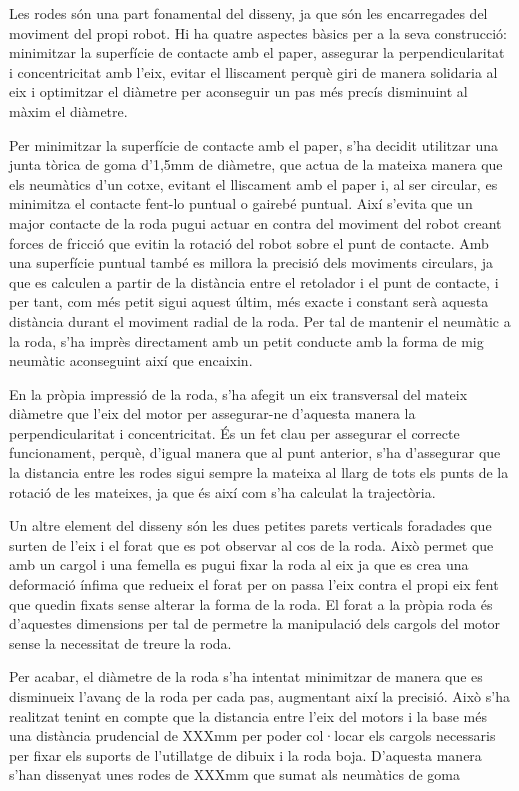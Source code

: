 Les rodes són una part fonamental del disseny, ja que són les encarregades del moviment del propi robot. Hi ha quatre aspectes bàsics per a la seva construcció: minimitzar la superfície de contacte amb el paper, assegurar la perpendicularitat i concentricitat amb l’eix, evitar el lliscament perquè giri de manera solidaria al eix i optimitzar el diàmetre per aconseguir un pas més precís disminuint al màxim el diàmetre. 

Per minimitzar la superfície de contacte amb el paper, s’ha decidit utilitzar una junta tòrica de goma d’1,5mm de diàmetre, que actua de la mateixa manera que els neumàtics d’un cotxe, evitant el lliscament amb el paper i, al ser circular, es minimitza el contacte fent-lo puntual o gairebé puntual. Així s’evita que un major contacte de la roda pugui actuar en contra del moviment del robot creant forces de fricció que evitin la rotació del robot sobre el punt de contacte. Amb una superfície puntual també es millora la precisió dels moviments circulars, ja que es calculen a partir de la distància entre el retolador i el punt de contacte, i per tant, com més petit sigui aquest últim, més exacte i constant serà aquesta distància durant el moviment radial de la roda. Per tal de mantenir el neumàtic a la roda, s’ha imprès directament amb un petit conducte amb la forma de mig neumàtic aconseguint així que encaixin. 

En la pròpia impressió de la roda, s’ha afegit un eix transversal del mateix diàmetre que l’eix del motor per assegurar-ne d’aquesta manera la perpendicularitat i concentricitat. És un fet clau per assegurar el correcte funcionament, perquè, d’igual manera que al punt anterior, s’ha d’assegurar que la distancia entre les rodes sigui sempre la mateixa al llarg de tots els punts de la rotació de les mateixes, ja que és així com s’ha calculat la trajectòria. 

Un altre element del disseny són les dues petites parets verticals foradades que surten de l’eix i el forat que es pot observar al cos de la roda. Això permet que amb un cargol i una femella es pugui fixar la roda al eix ja que es crea una deformació ínfima que redueix el forat per on passa l’eix contra el propi eix fent que quedin fixats sense alterar la forma de la roda. El forat a la pròpia roda és d’aquestes dimensions per tal de permetre la manipulació dels cargols del motor sense la necessitat de treure la roda. 

Per acabar, el diàmetre de la roda s’ha intentat minimitzar de manera que es disminueix l’avanç de la roda per cada pas, augmentant així la precisió. Això s’ha realitzat tenint en compte que la distancia entre l’eix del motors i la base més una distància prudencial de XXXmm per poder col·locar els cargols necessaris per fixar els suports de l’utillatge de dibuix i la roda boja. D’aquesta manera s’han dissenyat unes rodes de XXXmm que sumat als neumàtics de goma

